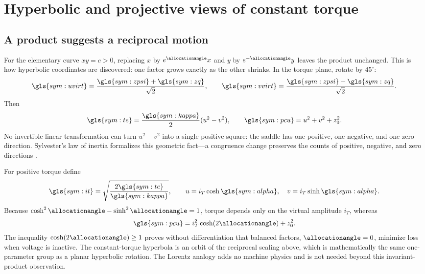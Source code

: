 \section{Hyperbolic and projective views of constant torque}
\label{sec:hyperbolic}

\subsection{A product suggests a reciprocal motion}

For the elementary curve \(xy=c>0\), replacing
\(x\) by \(e^{\allocationangle}x\) and \(y\) by \(e^{-\allocationangle}y\) leaves the product
unchanged. This is how hyperbolic coordinates are discovered: one factor grows
exactly as the other shrinks. In the torque plane, rotate by \(45^\circ\):
\begin{equation}
 \gls{sym:uvirt}=\frac{\gls{sym:zpsi}+\gls{sym:zq}}{\sqrt2},\qquad
 \gls{sym:vvirt}=\frac{\gls{sym:zpsi}-\gls{sym:zq}}{\sqrt2}.
 \label{eq:uv-rotation}
\end{equation}
Then
\begin{equation}
 \gls{sym:te}=\frac{\gls{sym:kappa}}2(u^2-v^2),\qquad
 \gls{sym:pcu}=u^2+v^2+z_0^2.
 \label{eq:signature-form}
\end{equation}
No invertible linear transformation can turn \(u^2-v^2\) into a single
positive square: the saddle has one positive, one negative, and one zero
direction. Sylvester's law of inertia formalizes this geometric fact---a
congruence change preserves the counts of positive, negative, and zero
directions \cite{horn2013}.

For positive torque define
\begin{equation}
 \gls{sym:it}=\sqrt{\frac{2\gls{sym:te}}{\gls{sym:kappa}}},\qquad
 u=i_T\cosh\gls{sym:alpha},\quad v=i_T\sinh\gls{sym:alpha}.
 \label{eq:hyperbolic-coordinates}
\end{equation}
Because \(\cosh^2\allocationangle-\sinh^2\allocationangle=1\), torque depends only on the virtual
amplitude \(i_T\), whereas
\begin{equation}
 \gls{sym:pcu}=i_T^2\cosh(2\allocationangle)+z_0^2.
 \label{eq:hyperbolic-loss}
\end{equation}
The inequality \(\cosh(2\allocationangle)\geq1\) proves without differentiation that
balanced factors, \(\allocationangle=0\), minimize loss when voltage is inactive. The
constant-torque hyperbola is an orbit of the reciprocal scaling above, which
is mathematically the same one-parameter group as a planar hyperbolic
rotation. The Lorentz analogy adds no machine physics and is not needed beyond
this invariant-product observation.

